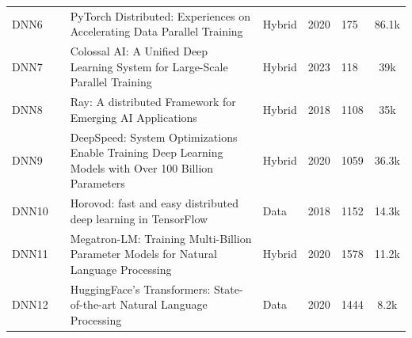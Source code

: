 \begin{table}[th!]
\begin{tabular}{llp{8.4cm}lllc}
		\small DNN6        & \small \cite{li_pytorch_2020}           & \small PyTorch Distributed: Experiences on Accelerating Data Parallel Training                                                      & \small Hybrid        & \small 2020          & \small 175                & \small 86.1k \cite{noauthor_pytorchpytorch_nodate}                   \\[1ex]
		\small DNN7        & \small \cite{li_colossal-ai_2023}       & \small Colossal AI: A Unified Deep Learning System for Large-Scale Parallel Training                                                & \small Hybrid        & \small 2023          & \small 118                & \small 39k \cite{noauthor_hpcaitechcolossalai_2025}                  \\[1ex]
		\small DNN8        & \small \cite{moritz_ray_2018}           & \small Ray: A distributed Framework for Emerging AI Applications                                                                    & \small Hybrid        & \small 2018          & \small 1108               & \small 35k \cite{noauthor_ray-projectray_2025}                       \\[1ex]
		\small DNN9        & \small \cite{rasley_deepspeed_2020}     & \small DeepSpeed: System Optimizations Enable Training Deep Learning Models with Over 100 Billion Parameters                        & \small Hybrid        & \small 2020          & \small 1059               & \small 36.3k \cite{noauthor_microsoftdeepspeed_2025}                 \\[1ex]
		\small DNN10       & \small \cite{sergeev_horovod_2018}      & \small Horovod: fast and easy distributed deep learning in TensorFlow                                                               & \small Data          & \small 2018          & \small 1152               & \small 14.3k \cite{noauthor_horovodhorovod_2025}                     \\[1ex]
		\small DNN11       & \small \cite{shoeybi_megatron-lm_2020}  & \small Megatron-LM: Training Multi-Billion Parameter Models for Natural Language Processing                                         & \small Hybrid        & \small 2020          & \small 1578               & \small 11.2k \cite{noauthor_nvidiamegatron-lm_2025}                  \\[1ex]
		\small DNN12       & \small \cite{wolf_huggingfaces_2020}    & \small HuggingFace's Transformers: State-of-the-art Natural Language Processing                                                     & \small Data          & \small 2020          & \small 1444               & \small 8.2k \cite{noauthor_huggingfaceaccelerate_2025}               \\[1ex]

\end{tabular}
\end{table}
